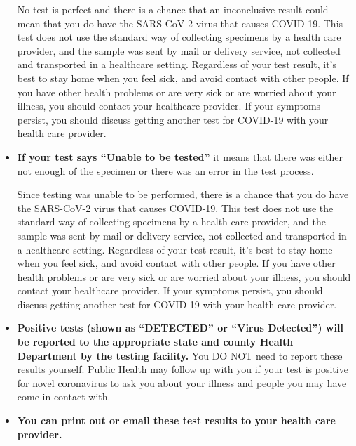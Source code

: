 \documentclass[10pt]{article}
\begin{document}
\begin{itemize}
  No test is perfect and there is a chance that an inconclusive result
  could mean that you do have the SARS-CoV-2 virus that causes COVID-19.
  This test does not use the standard way of collecting specimens by a
  health care provider, and the sample was sent by mail or delivery service, not collected and
  transported in a healthcare setting. Regardless of your test result,
  it's best to stay home when you feel sick, and avoid contact with other
  people. If you have other health problems or are very sick or are
  worried about your illness, you should contact your healthcare provider.
  If your symptoms persist, you should discuss getting another test for
  COVID-19 with your health care provider.

\item

  \textbf{If your test says ``Unable to be tested''} it means that there
  was either not enough of the specimen or there was an error in the
  test process.

  Since testing was unable to be performed, there is a chance that you do
  have the SARS-CoV-2 virus that causes COVID-19. This test does not use
  the standard way of collecting specimens by a health care provider, and
  the sample was sent by mail or delivery service, not collected and transported in a
  healthcare setting. Regardless of your test result, it's best to stay
  home when you feel sick, and avoid contact with other people. If you
  have other health problems or are very sick or are worried about your
  illness, you should contact your healthcare provider. If your symptoms
  persist, you should discuss getting another test for COVID-19 with your
  health care provider.

\item

  \textbf{Positive tests (shown as ``DETECTED'' or ``Virus Detected'')
  will be reported to the appropriate state and county Health Department
  by the testing facility.} You DO NOT need to report these results
  yourself. Public Health may follow up with you if your test is
  positive for novel coronavirus to ask you about your illness and
  people you may have come in contact with.

\item

  \textbf{You can print out or email these test results to your health
  care provider.}

\end{itemize}
\end{document}
